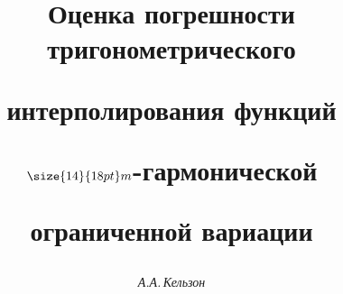 









\newcommand{\tts}[1]{}


\renewcommand{\baselinestretch}{0.97}







\setcounter{page}{49}















\author{\it А.А.\,Кельзон}




\title{Оценка погрешности тригонометрического


интерполирования функций


$\size{14}{18pt}\selectfont m$-гармонической


ограниченной вариации}





\date{}




\pagestyle{plain} %







\maketitle


